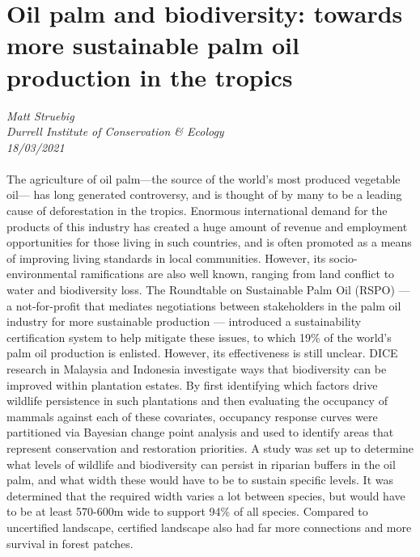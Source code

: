 \documentclass[11pt]{article}
\begin{document}
\section{Oil palm and biodiversity: towards more sustainable palm oil production in the tropics}
\textit{Matt Struebig\\Durrell Institute of Conservation & Ecology\\18/03/2021}
\\
\\The agriculture of oil palm—the source of the world's most produced vegetable oil— has long generated controversy, and is thought of by many to be a leading cause of deforestation in the tropics. Enormous international demand for the products of this industry has created a huge amount of revenue and employment opportunities for those living in such countries, and is often promoted as a means of improving living standards in local communities. However, its socio-environmental ramifications are also well known, ranging from land conflict to water and biodiversity loss. The Roundtable on Sustainable Palm Oil (RSPO) — a not-for-profit that mediates negotiations between stakeholders in the palm oil industry for more sustainable production — introduced a sustainability certification system to help mitigate these issues, to which 19\% of the world’s palm oil production is enlisted. However, its effectiveness is still unclear. DICE research in Malaysia and Indonesia investigate ways that biodiversity can be improved within plantation estates. By first identifying which factors drive wildlife persistence in such plantations and then evaluating the occupancy of mammals against each of these covariates, occupancy response curves were partitioned via Bayesian change point analysis and used to identify areas that represent conservation and restoration priorities. A study was set up to determine what levels of wildlife and biodiversity can persist in riparian buffers in the oil palm, and what width these would have to be to sustain specific levels. It was determined that the required width varies a lot between species, but would have to be at least 570-600m wide to support 94\% of all species. Compared to uncertified landscape, certified landscape also had far more connections and more survival in forest patches.
\end{document}
